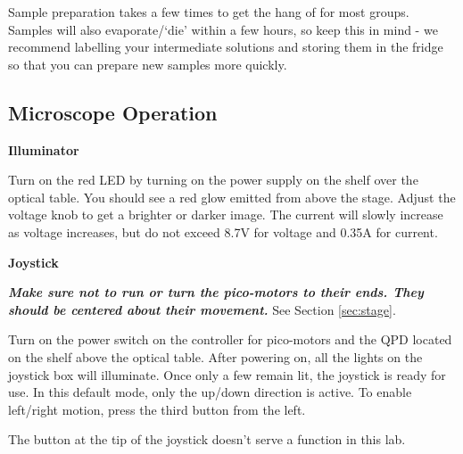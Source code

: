 \documentclass{../lab}
\begin{document}
Sample preparation takes a few times to get the hang of for most groups. Samples will also evaporate/`die' within a few hours, so keep this in mind - we recommend labelling your intermediate solutions and storing them in the fridge so that you can prepare new samples more quickly.

\subsection{Microscope Operation}

\textbf{Illuminator}

Turn on the red LED by turning on the power supply on the shelf over the optical table. You should see a  red glow emitted from above the stage. Adjust the voltage knob to get a brighter or darker image. The current will slowly increase as voltage increases, but do not exceed 8.7V for voltage and 0.35A for current.

\textbf{Joystick}

\emph{\textbf{Make sure not to run or turn the pico-motors to their ends. They should be centered about their movement.}} See Section \ref{sec:stage}.

Turn on the power switch on the controller for pico-motors and the QPD located on the shelf above the optical table. After powering on, all the lights on the joystick box will illuminate. Once only a few remain lit, the joystick is ready for use. In this default mode, only the up/down direction is active. To enable left/right motion, press the third button from the left.





The button at the tip of the joystick doesn't serve a function in this lab. 


\end{document}
